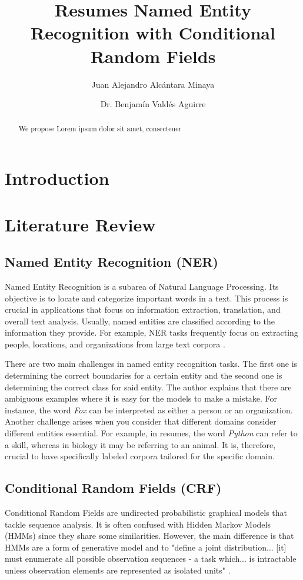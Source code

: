 \documentclass[a4paper, conference]{ieeeconf}
\title{
  \LARGE \bf Resumes Named Entity Recognition with Conditional Random Fields
}
\author{%
  Juan Alejandro Alcántara Minaya\\ \email{A01703947@exatec.tec.mx}
  \and
  Dr. Benjamín Valdés Aguirre\\ \email{bvaldes@tec.mx}
}
\begin{document}
  \maketitle
  \begin{abstract}
    We propose Lorem ipsum dolor sit amet, consecteuer
  \end{abstract} 

  \tableofcontents

  \section{Introduction}

  \section{Literature Review}
  \subsection{Named Entity Recognition (NER)}
  Named Entity Recognition is a subarea of Natural Language Processing. Its
  objective is to locate and categorize important words in a text. This process
  is crucial in applications that focus on information extraction, translation,
  and overall text analysis. Usually, named entities are classified according
  to the information they provide. For example, NER tasks frequently focus on
  extracting people, locations, and organizations from large text corpora
  \cite{Mohit2014}.

  There are two main challenges in named entity recognition tasks. The first
  one is determining the correct boundaries for a certain entity and the second
  one is determining the correct class for said entity. The author explains
  that there are ambiguous examples where it is easy for the models to make a
  mistake. For instance, the word \textit{Fox} can be interpreted as either a
  person or an organization. Another challenge arises when you consider that
  different domains consider different entities essential. For example, in
  resumes, the word \textit{Python} can refer to a skill, whereas in biology it
  may be referring to an animal. It is, therefore, crucial to have specifically
  labeled corpora tailored for the specific domain. \cite{Mohit2014}

  \subsection{Conditional Random Fields (CRF)}
  Conditional Random Fields are undirected probabilistic graphical models
  that tackle sequence analysis. It is often confused with Hidden Markov Models
  (HMMs) since they share some similarities. However, the main difference is
  that HMMs are a form of generative model and to "define a joint
  distribution... [it] must enumerate all possible observation sequences
  - a task which... is intractable unless observation elements are
  represented as isolated units" \cite{Wallach2004}.
\end{document}
